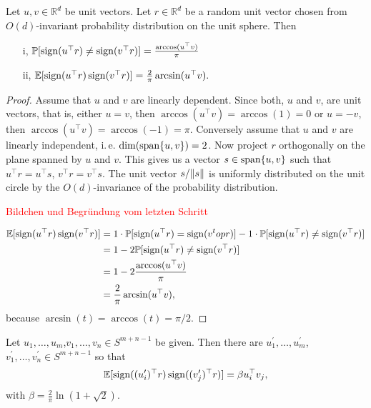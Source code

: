 \begin{lemma}\label{lem:G_id}
	Let $u,v\in\mathbb{R}^d$ be unit vectors. Let $r\in\mathbb{R}^d$ be a random unit vector chosen from $O(d)$-invariant probability distribution on the unit sphere. Then
	\begin{enumerate}
		\item[i,] $\mathbb{P}[\operatorname{sign}(u^\top r)\neq\operatorname{sign}(v^\top r)]=\frac{\arccos(u^\top v)}{\pi}$
		\item[ii,] $\mathbb{E}[\operatorname{sign}(u^\top r)\operatorname{sign}(v^\top r)]=\frac{2}{\pi}\arcsin(u^\top v).$
	\end{enumerate}
\end{lemma}
\begin{proof}
	Assume that $u$ and $v$ are linearly dependent. Since both, $u$ and $v$, are unit vectors, that is, either $u=v$, then $\arccos(u^\top v) = \arccos(1)=0$ or $u=-v$, then $\arccos(u^\top v) = \arccos(-1) = \pi$.
	Conversely assume that $u$ and $v$ are linearly independent, i.\,e. $\operatorname{dim}(\operatorname{span}\{u,v\})=2$. Now project $r$ orthogonally on the plane spanned by $u$ and $v$. This gives us a vector $s\in \operatorname{span}\{u,v\}$ such that $u^\top r = u^\top s$, $v^\top r = v^\top s$. The unit vector $s/ \Vert {s} \Vert$ is uniformly distributed on the unit circle by the $O(d)$-invariance of the probability distribution. 
	
	\textcolor{red}{Bildchen und Begründung vom letzten Schritt}
	
	\begin{align*}
		\mathbb{E}[\operatorname{sign}(u^\top r) \operatorname{sign}(v^\top r)]
		&= 1\cdot\mathbb{P}[\operatorname{sign}(u^\top r) = \operatorname{sign} (v^top r )] - 1\cdot \mathbb{P}[\operatorname{sign}(u^\top r) \neq \operatorname{sign}(v^\top r)] \\
		&= 1 - 2\mathbb{P}[\operatorname{sign}(u^\top r) \neq \operatorname{sign}(v^\top r)] \\
		&= 1 - 2 \frac{\arccos(u^\top v)}{\pi} \\
		&= \frac{2}{\pi} \arcsin(u^\top v),
	\end{align*}
	because $\arcsin (t) = \arccos(t) = \pi/2$.
\end{proof}

\begin{lemma}\label{lem:krivines_trick}
	Let $u_1,\dots,u_m$,$v_1,\dots,v_n\in S^{m+n-1}$ be given. Then there are $u_1^\prime,\dots,u_m^\prime$,$v_1^\prime,\dots,v_n^\prime\in S^{m+n-1}$ so that
	\begin{equation}
		\mathbb{E}[\operatorname{sign}((u_i^\prime)^\top r)\operatorname{sign}((v_j^\prime)^\top r)] = \beta u_i^\top v_j,
	\end{equation}		
	with $\beta = \frac{2}{\pi} \ln (1+\sqrt{2}).$
\end{lemma}

